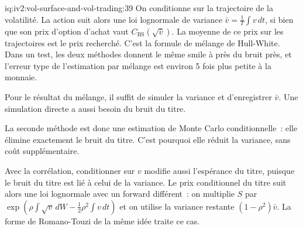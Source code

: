 \begin{solution}{iq:iv2:vol-surface-and-vol-trading:39}
On conditionne sur la trajectoire de la volatilité. La action suit alors une loi lognormale de variance $\bar v = \frac1T\int v\,dt$, si bien que son prix d'option d'achat vaut $C_{\text{BS}}(\sqrt{\bar v})$. La moyenne de ce prix sur les trajectoires est le prix recherché. C'est la formule de mélange de Hull-White. Dans un test, les deux méthodes donnent le même smile à près du bruit près, et l'erreur type de l'estimation par mélange est environ 5 fois plus petite à la monnaie.

Pour le résultat du mélange, il suffit de simuler la variance et d'enregistrer $\bar v$. Une simulation directe a aussi besoin du bruit du titre.

La seconde méthode est donc une estimation de Monte Carlo conditionnelle~: elle élimine exactement le bruit du titre. C'est pourquoi elle réduit la variance, sans coût supplémentaire.

Avec la corrélation, conditionner sur $v$ modifie aussi l'espérance du titre, puisque le bruit du titre est lié à celui de la variance. Le prix conditionnel du titre suit alors une loi lognormale avec un forward différent~: on multiplie $S$ par $\exp(\rho\int\sqrt v\,dW - \tfrac12\rho^2\int v\,dt)$ et on utilise la variance restante $(1 - \rho^2)\bar v$. La forme de Romano-Touzi de la même idée traite ce cas.

\end{solution}

